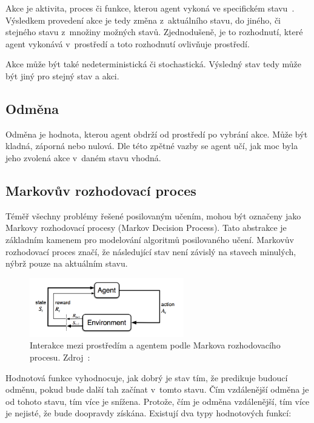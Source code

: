 Akce je aktivita, proces či funkce, kterou agent vykoná ve specifickém stavu~\cite{ActionCo67}.
Výsledkem provedení akce je tedy změna z~aktuálního stavu, do jiného, či stejného stavu z~množiny možných stavů.
Zjednodušeně, je to rozhodnutí, které agent vykonává v~prostředí a toto rozhodnutí ovlivňuje prostředí.

Akce může být také nedeterministická či stochastická.
Výsledný stav tedy může být jiný pro stejný stav a akci.
  
\subsection{Odměna}\label{subsec:odmena}

  Odměna je hodnota, kterou agent obdrží od prostředí po vybrání akce.
  Může být kladná, záporná nebo nulová.
  Dle této zpětné vazby se agent učí, jak moc byla jeho zvolená akce v~daném stavu vhodná.

\subsection{Markovův rozhodovací proces}\label{subsec:markovovy-rozhodovaci-proces}

  Téměř všechny problémy řešené posilovaným učením, mohou být označeny jako Markovy rozhodovací procesy (Markov Decision Process).
  Tato abstrakce je základním kamenem pro modelování algoritmů posilovaného učení.
  Markovův rozhodovací proces značí, že následující stav není závislý na stavech minulých, nýbrž pouze na aktuálním stavu.
  
  \begin{figure}[H]
    \centering
    \includegraphics[width=0.6\textwidth]{obrazky-figures/RL_basics}
    \caption{Interakce mezi prostředím a agentem podle Markova rozhodovacího procesu.
    Zdroj~\cite{RL_basics}:}\label{fig:markov}
  \end{figure}
  \begin{definition}
  \end{definition}

Hodnotová funkce vyhodnocuje, jak dobrý je stav tím, že predikuje budoucí odměnu, pokud bude další tah začínat v~tomto stavu.
Čím vzdálenější odměna je od tohoto stavu, tím více je snížena.
Protože, čím je odměna vzdálenější, tím více je nejisté, že bude doopravdy získána.
Existují dva typy hodnotových funkcí:


